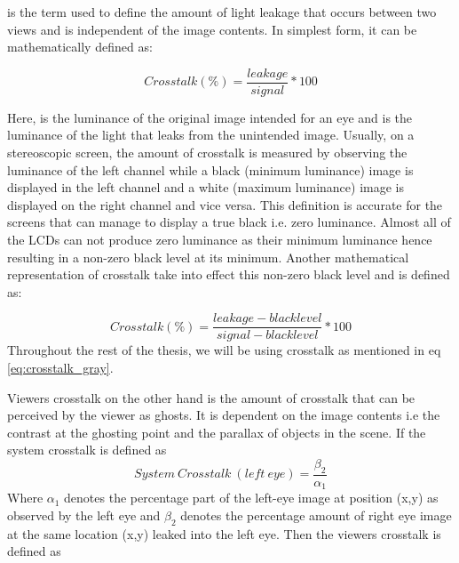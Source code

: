  is the term used to define the amount of light leakage that occurs between two views and is independent of the image contents. In simplest form, it can be mathematically defined as:

\begin{equation}
Crosstalk(\%) = \frac{leakage}{signal} *100
\label{eq:simple_crosstalk}
\end{equation}

Here,  is the luminance of the original image intended for an eye and  is the luminance of the light that leaks from the unintended image. Usually, on a stereoscopic screen, the amount of crosstalk is measured by observing the luminance of the left channel while a black (minimum luminance) image is displayed in the left channel and a white (maximum luminance) image is displayed on the right channel and vice versa. This definition is accurate for the screens that can manage to display a true black i.e. zero luminance. Almost all of the LCDs can not produce zero luminance as their minimum luminance hence resulting in a non-zero black level at its minimum. Another mathematical representation of crosstalk take into effect this non-zero black level and is defined as:

\begin{equation}
Crosstalk(\%) = \frac{leakage - black level}{signal - black level} *100
\label{eq:crosstalk_gray}
\end{equation}
Throughout the rest of the thesis, we will be using crosstalk as mentioned in eq \ref{eq:crosstalk_gray}.

Viewers crosstalk on the other hand is the amount of crosstalk that can be perceived by the viewer as ghosts. It is dependent on the image contents i.e the contrast at the ghosting point and the parallax of objects in the scene. If the system crosstalk is defined as
\begin{equation}
System\ Crosstalk\ (left\ eye) = \frac{\beta_2}{\alpha_1}
\label{eq:system_ct}
\end{equation}
Where \(\alpha_1\) denotes the percentage part of the left-eye image at position (x,y) as observed by the left eye and \(\beta_2\) denotes the percentage amount of right eye image at the same location (x,y) leaked into the left eye. Then the viewers crosstalk is defined as

